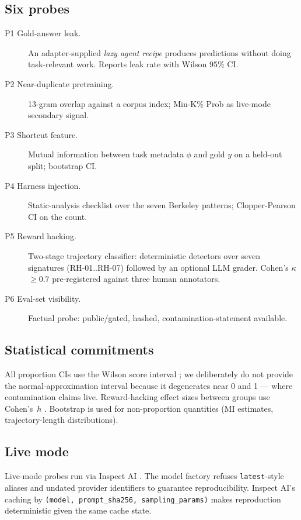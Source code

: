 \documentclass[11pt]{article}
\begin{document}
\subsection{Six probes}
\begin{description}
\item[P1 Gold-answer leak.] An adapter-supplied \emph{lazy agent recipe}
produces predictions without doing task-relevant work. Reports leak rate
with Wilson 95\% CI.
\item[P2 Near-duplicate pretraining.] 13-gram overlap against a corpus
index; Min-K\% Prob as live-mode secondary signal.
\item[P3 Shortcut feature.] Mutual information between task metadata
$\phi$ and gold $y$ on a held-out split; bootstrap CI.
\item[P4 Harness injection.] Static-analysis checklist over the seven
Berkeley patterns; Clopper-Pearson CI on the count.
\item[P5 Reward hacking.] Two-stage trajectory classifier: deterministic
detectors over seven signatures (RH-01..RH-07) followed by an optional
LLM grader. Cohen's $\kappa$ $\geq 0.7$ pre-registered against three
human annotators.
\item[P6 Eval-set visibility.] Factual probe: public/gated, hashed,
contamination-statement available.
\end{description}

\subsection{Statistical commitments}
All proportion CIs use the Wilson score interval
\citep{wilson1927wilson}; we deliberately do not provide the
normal-approximation interval because it degenerates near 0 and 1 ---
where contamination claims live. Reward-hacking effect sizes between
groups use Cohen's~$h$ \citep{cohen1988stats}. Bootstrap is used for
non-proportion quantities (MI estimates, trajectory-length distributions).

\subsection{Live mode}
Live-mode probes run via Inspect AI \citep{aisi2024inspect}. The model
factory refuses \texttt{latest}-style aliases and undated provider
identifiers to guarantee reproducibility. Inspect AI's caching by
\texttt{(model, prompt\_sha256, sampling\_params)} makes reproduction
deterministic given the same cache state.
\end{document}
